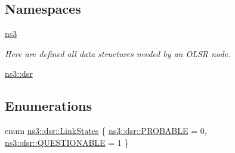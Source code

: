 \subsection*{Namespaces}
\begin{DoxyCompactItemize}
\item 
 \hyperlink{namespacens3}{ns3}
\begin{DoxyCompactList}\small\item\em Here are defined all data structures needed by an O\+L\+SR node. \end{DoxyCompactList}\item 
 \hyperlink{namespacens3_1_1dsr}{ns3\+::dsr}
\end{DoxyCompactItemize}
\subsection*{Enumerations}
\begin{DoxyCompactItemize}
\item 
enum \hyperlink{namespacens3_1_1dsr_ac9e5787558472a1653f08327f988425f}{ns3\+::dsr\+::\+Link\+States} \{ \hyperlink{namespacens3_1_1dsr_ac9e5787558472a1653f08327f988425fa0cc42d723936d3ceefcd3cb345b7dcba}{ns3\+::dsr\+::\+P\+R\+O\+B\+A\+B\+LE} = 0, 
\hyperlink{namespacens3_1_1dsr_ac9e5787558472a1653f08327f988425faf16c354be3f23d4b7cd6f34e46b23327}{ns3\+::dsr\+::\+Q\+U\+E\+S\+T\+I\+O\+N\+A\+B\+LE} = 1
 \}
\end{DoxyCompactItemize}
